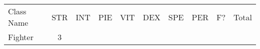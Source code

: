 \documentclass[12pt]{article}
\begin{document}
\begin{longtable}[]{@{}|l|c|c|c|c|c|c|c|c|r|@{}}
\toprule
\begin{minipage}[t]{0.13\columnwidth}\raggedright\strut
Class Name
\strut\end{minipage} &
\begin{minipage}[t]{0.06\columnwidth}\raggedright\strut
STR
\strut\end{minipage} &
\begin{minipage}[t]{0.06\columnwidth}\raggedright\strut
INT
\strut\end{minipage} &
\begin{minipage}[t]{0.06\columnwidth}\raggedright\strut
PIE
\strut\end{minipage} &
\begin{minipage}[t]{0.06\columnwidth}\raggedright\strut
VIT
\strut\end{minipage} &
\begin{minipage}[t]{0.06\columnwidth}\raggedright\strut
DEX
\strut\end{minipage} &
\begin{minipage}[t]{0.06\columnwidth}\raggedright\strut
SPE
\strut\end{minipage} &
\begin{minipage}[t]{0.06\columnwidth}\raggedright\strut
PER
\strut\end{minipage} &
\begin{minipage}[t]{0.07\columnwidth}\raggedright\strut
F?
\strut\end{minipage} &
\begin{minipage}[t]{0.08\columnwidth}\raggedright\strut
Total
\strut\end{minipage}\tabularnewline \hhline{|*{10}{=|}}
\begin{minipage}[t]{0.13\columnwidth}\raggedright\strut
Fighter
\strut\end{minipage} &
\begin{minipage}[t]{0.06\columnwidth}\raggedright\strut
3
\strut\end{minipage} &
\begin{minipage}[t]{0.06\columnwidth}\raggedright\strut
\strut\end{minipage} &
\begin{minipage}[t]{0.06\columnwidth}\raggedright\strut
\strut\end{minipage} &
\begin{minipage}[t]{0.06\columnwidth}\raggedright\strut
\strut\end{minipage} &
\begin{minipage}[t]{0.06\columnwidth}\raggedright\strut

\end{minipage}
\end{longtable}
\end{document}

